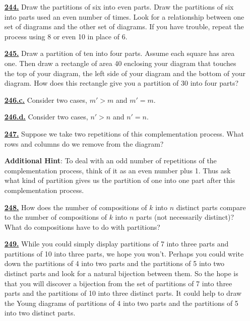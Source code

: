 \documentclass[10pt,]{book}
\theoremstyle{plain}
\theoremstyle{definition}
\theoremstyle{definition}
\theoremstyle{definition}
\numberwithin{equation}{chapter}
\newcommand{\gt}{>}
\begin{document}
\begin{itemize}[itemsep=1em]
\hypertarget{a-244}{}\item[\textbf{\hyperref[partition-even-mult-even-use]{244.}}]
\hypertarget{p-1102}{}%
Draw the partitions of six into even parts. Draw the partitions of six into parts used an even number of times. Look for a relationship between one set of diagrams and the other set of diagrams. If you have trouble, repeat the process using 8 or even 10 in place of 6.%

\hypertarget{a-245}{}\item[\textbf{\hyperref[rectanglecomplement]{245.}}]
\hypertarget{p-1105}{}%
Draw a partition of ten into four parts. Assume each square has area one. Then draw a rectangle of area 40 enclosing your diagram that touches the top of your diagram, the left side of your diagram and the bottom of your diagram. How does this rectangle give you a partition of 30 into four parts?%

\hypertarget{a-246.c}{}\item[\textbf{\hyperref[task-196]{246.c.}}]
\hypertarget{p-1113}{}%
Consider two cases, \(m' \gt m\) and \(m' = m\).%

\hypertarget{a-246.d}{}\item[\textbf{\hyperref[task-197]{246.d.}}]
\hypertarget{p-1116}{}%
Consider two cases, \(n' \gt n\) and \(n' = n\).%

\hypertarget{a-247}{}\item[\textbf{\hyperref[activity-247]{247.}}]
\hypertarget{p-1123}{}%
Suppose we take two repetitions of this complementation process. What rows and columns do we remove from the diagram?%

\par\smallskip
\noindent\textbf{Additional Hint}: \hypertarget{p-1124}{}%
To deal with an odd number of repetitions of the complementation process, think of it as an even number plus 1. Thus ask what kind of partition gives us the partition of one into one part after this complementation process.%

\hypertarget{a-248}{}\item[\textbf{\hyperref[activity-248]{248.}}]
\hypertarget{p-1131}{}%
How does the number of compositions of \(k\) into \(n\) distinct parts compare to the number of compositions of \(k\) into \(n\) parts (not necessarily distinct)? What do compositions have to do with partitions?%

\hypertarget{a-249}{}\item[\textbf{\hyperref[activity-249]{249.}}]
\hypertarget{p-1134}{}%
While you could simply display partitions of 7 into three parts and partitions of 10 into three parts, we hope you won't. Perhaps you could write down the partitions of 4 into two parts and the partitions of 5 into two distinct parts and look for a natural bijection between them. So the hope is that you will discover a bijection from the set of partitions of 7 into three parts and the partitions of 10 into three distinct parts. It could help to draw the Young diagrams of partitions of 4 into two parts and the partitions of 5 into two distinct parts.%


\end{itemize}
\end{document}
